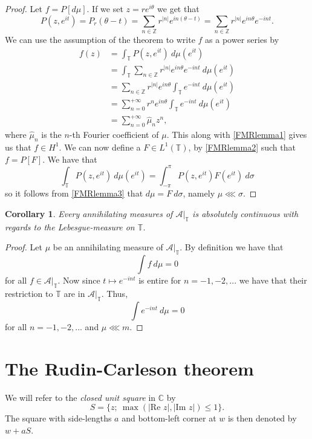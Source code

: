 \documentclass[a4paper,12pt,twoside,BCOR=10mm]{scrbook}
\newtheorem{corollary}[theorem]{Corollary}
\theoremstyle{definition}
\theoremstyle{definition}
\theoremstyle{definition}
\renewcommand{\Re}{\text{Re }}
\renewcommand{\Im}{\text{Im }}
\begin{document}
\begin{proof}
Let $f = P[d\mu]$.
If we set $z = re^{i\theta}$ we get that
\[
	P(z, e^{it})
		= P_r(\theta - t)
		= \sum_{n \in \mathbb{Z}} r^{|n|}e^{in(\theta - t)}
		= \sum_{n \in \mathbb{Z}} r^{|n|}e^{in\theta}e^{-int}.
\]
We can use the assumption of the theorem to write $f$ as a power series by
\begin{align*}
	f(z) 
	&= \int_{\mathbb{T}} P(z, e^{it})\ d\mu(e^{it}) \\
	&= \int_{\mathbb{T}} \sum_{n \in \mathbb{Z}} r^{|n|}e^{in\theta}e^{-int}\ d\mu(e^{it}) \\
	&= \sum_{n \in \mathbb{Z}} r^{|n|}e^{in\theta} \int_{\mathbb{T}} e^{-int}\ d\mu(e^{it}) \\
	&= \sum_{n = 0}^{+\infty} r^n e^{in\theta} \int_{\mathbb{T}} e^{-int}\ d\mu(e^{it}) \\
	&= \sum_{n = 0}^{+\infty} \hat{\mu}_n z^n,
\end{align*}
where $\hat{\mu}_n$ is the $n$-th Fourier coefficient of $\mu$.
This along with \ref{FMRlemma1} gives us that $f \in H^1$.
We can now define a $F \in L^1(\mathbb{T})$, by \ref{FMRlemma2} such that $f = P[F]$.
We have that
\[
	\int_{\mathbb{T}} P(z, e^{it})\ d\mu(e^{it})
	=
	\int_{-\pi}^{\pi} P(z, e^{it}) F(e^{it})\ d\sigma
\]
so it follows from \ref{FMRlemma3} that $d\mu = F\ d\sigma$, namely $\mu \lll \sigma$.
\end{proof}
\begin{corollary}
\label{fmrieszcor}
Every annihilating measures of $\mathcal{A}|_{\mathbb{T}}$ is absolutely continuous with regards to the Lebesgue-measure on $\mathbb{T}$.
\end{corollary}
\begin{proof}
Let $\mu$ be an annihilating measure of $\mathcal{A}|_{\mathbb{T}}$.
By definition we have that
\[
	\int f\ d\mu = 0
\]
for all $f \in \mathcal{A}|_{\mathbb{T}}$.
Now since $t \mapsto e^{-int}$ is entire for $n = -1, -2, ...$ we have that their restriction to $\mathbb{T}$ are in $\mathcal{A}|_{\mathbb{T}}$.
Thus,
\[
	\int e^{-int}\ d\mu = 0
\]
for all $n = -1, -2, ...$ and $\mu \lll m$.
\end{proof}



\section{The Rudin-Carleson theorem}
\label{section2}
We will refer to the \emph{closed unit square} in $\mathbb{C}$ by
\[
\label{index26}
	S = \{z;\ \max(|\Re z|, |\Im z|) \leq 1\}.
\]
The square with side-lengths $a$ and bottom-left corner at $w$ is then denoted by $w + aS$.
\end{document}
